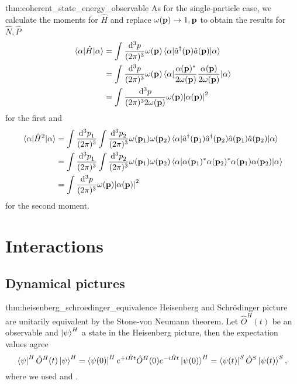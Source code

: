 \begin{delayedproof}{thm:coherent_state_energy_observable}
	As for the single-particle case, we calculate the moments for $\hat{H}$ and replace $\omega(\vb{p})\to1,\vb{p}$ to obtain the results for $\hat{N},\hat{P}$
	\begin{equation}
		\begin{split}
			\expval{\hat{H}}{\alpha}
			&=
			\int\frac{\dd[3]{p}}{(2\pi)^3}
			\omega(\vb{p})
			\expval{\hat{a}^\dagger(\vb{p})\hat{a}(\vb{p})}{\alpha}
			\\
			&=
			\int\frac{\dd[3]{p}}{(2\pi)^3}
			\omega(\vb{p})
			\expval{\frac{\alpha(\vb{p})^*}{2\omega(\vb{p})}\frac{\alpha(\vb{p})}{2\omega(\vb{p})}}{\alpha}
			\\
			&=
			\int\frac{\dd[3]{p}}{(2\pi)^32\omega(\vb{p})}
			\omega(\vb{p})
			\abs{\alpha(\vb{p})}^2
		\end{split}
	\end{equation}
	for the first and
	\begin{equation}
		\begin{split}
			\expval{\hat{H}^2}{\alpha}
			&=
			\int\frac{\dd[3]{p}_1}{(2\pi)^3}
			\int\frac{\dd[3]{p}_2}{(2\pi)^3}
			\omega(\vb{p}_1)
			\omega(\vb{p}_2)
			\expval{
				\hat{a}^\dagger(\vb{p}_1)
				\hat{a}^\dagger(\vb{p}_2)
				\hat{a}(\vb{p}_1)
				\hat{a}(\vb{p}_2)
			}{\alpha}
			\\
			&=
			\int\frac{\dd[3]{p}_1}{(2\pi)^3}
			\int\frac{\dd[3]{p}_2}{(2\pi)^3}
			\omega(\vb{p}_1)
			\omega(\vb{p}_2)
			\expval{
				\alpha(\vb{p}_1)^*
				\alpha(\vb{p}_2)^*
				\alpha(\vb{p}_1)
				\alpha(\vb{p}_2)
			}{\alpha}
			\\
			&=
			\int\frac{\dd[3]{p}}{(2\pi)^3}
			\omega(\vb{p})
			\abs{\alpha(\vb{p})}^2
		\end{split}
	\end{equation}
	for the second moment.
\end{delayedproof}

\section{Interactions}

\subsection{Dynamical pictures}

\begin{delayedproof}{thm:heisenberg_schroedinger_equivalence}
	Heisenberg and Schrödinger picture are unitarily equivalent by the Stone-von Neumann theorem.
	Let $\hat{O}^H(t)$ be an observable and $\ket{\psi}^H$ a state in the Heisenberg picture, then the expectation values agree
	\begin{equation}
		\bra{\psi}^H
		\hat{O}^H(t)
		\ket{\psi}^H
		=
		\bra{\psi(0)}^H
		e^{+i\hat{H}t}
		\hat{O}^H(0)
		e^{-i\hat{H}t}
		\ket{\psi(0)}^H
		=
		\bra{\psi(t)}^S
		\hat{O}^S
		\ket{\psi(t)}^S
		,
	\end{equation}
	where we used  and .
\end{delayedproof}

